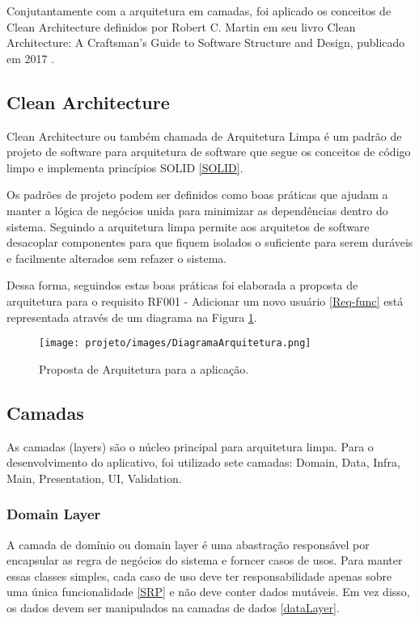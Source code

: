 \documentclass[12pt]{article}
\begin{document}
Conjutantamente com a arquitetura em camadas, foi aplicado os conceitos de Clean Architecture definidos por Robert C. Martin em seu livro Clean Architecture: A Craftsman's Guide to Software Structure and Design, publicado em 2017 \cite{cleanArchitecture}.

\subsection{Clean Architecture}
Clean Architecture ou também chamada de Arquitetura Limpa é um padrão de projeto de software para arquitetura de software que segue os conceitos de código limpo e implementa princípios SOLID \ref{SOLID}.

Os padrões de projeto podem ser definidos como boas práticas que ajudam a manter a lógica de negócios unida para minimizar as dependências dentro do sistema. Seguindo a arquitetura limpa permite aos arquitetos de software desacoplar componentes para que fiquem isolados o suficiente para serem duráveis e facilmente alterados sem refazer o sistema.

Dessa forma, seguindos estas boas práticas foi elaborada a proposta de arquitetura para o requisito RF001 - Adicionar um novo usuário \ref{Req-func} está representada através de um diagrama na Figura \ref{fig:DiagramaArquitetura}.

\begin{figure}[!ht]
  \centering
  \texttt{[image: projeto/images/DiagramaArquitetura.png]}
  \caption{Proposta de Arquitetura para a aplicação.}
  \label{fig:DiagramaArquitetura}
\end{figure}

\subsection{Camadas}
As camadas (layers) são o núcleo principal para arquitetura limpa. 
Para o desenvolvimento do aplicativo, foi utilizado sete camadas: Domain, Data, Infra, Main, Presentation, UI, Validation.

\subsubsection{Domain Layer}
\label{domainLayer}
A camada de domínio ou domain layer é uma abastração responsável por encapsular as regra de negócios do sistema e forncer casos de usos. Para manter essas classes simples, cada caso de uso deve ter responsabilidade apenas sobre uma única funcionalidade \ref{SRP} e não deve conter dados mutáveis. Em vez disso, os dados devem ser manipulados na camadas de dados \ref{dataLayer}.
\end{document}
